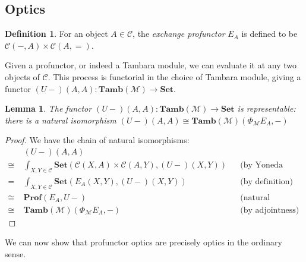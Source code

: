 \documentclass[11pt,a4paper]{article}
\theoremstyle{plain}
\newtheorem{lemma}[theorem]{Lemma}
\theoremstyle{definition}
\newtheorem{definition}[theorem]{Definition}
\newcommand{\C}{\mathscr{C}}
\newcommand{\M}{\mathscr{M}}
\newcommand{\Pastro}{\Phi}
\newcommand{\Set}{\mathbf{Set}}
\newcommand{\Prof}{\mathbf{Prof}}
\newcommand{\Tamb}{\mathbf{Tamb}}
\begin{document}
\subsection{Optics}
\begin{definition}
  For an object $A \in \C$, the \emph{exchange profunctor} $E_A$ is defined to be $\C(-, A) \times \C(A, {=})$.
\end{definition}

Given a profunctor, or indeed a Tambara module, we can evaluate it at any two objects of $\C$. This process is functorial in the choice of Tambara module, giving a functor $(U-)(A,A) : \Tamb(\M) \to \Set$.

\begin{lemma}\label{lemma-rep}
  The functor $(U-)(A,A) : \Tamb(\M) \to \Set$ is representable: there is a natural isomorphism
  $(U-)(A,A) \cong \Tamb(\M)(\Pastro_\M E_A, -)$
\end{lemma}
\begin{proof}
  We have the chain of natural isomorphisms:
  \begin{align*}
    &(U-)(A,A) \\
    \cong \;&\int_{X,Y \in \C} \Set(\C(X,A) \times \C(A,Y), (U-)(X,Y)) && \text{(by Yoneda (un)reduction twice)} \\
    =\;&\int_{X,Y \in \C} \Set(E_A(X,Y), (U-)(X,Y)) && \text{(by definition)}\\
    \cong \;&\Prof(E_A, U-) && \text{(natural transformations as ends)} \\
    \cong \;&\Tamb(\M)(\Pastro_\M E_A, -) && \text{(by adjointness)}
  \end{align*}
\end{proof}

We can now show that profunctor optics are precisely optics in the ordinary sense.
\end{document}
